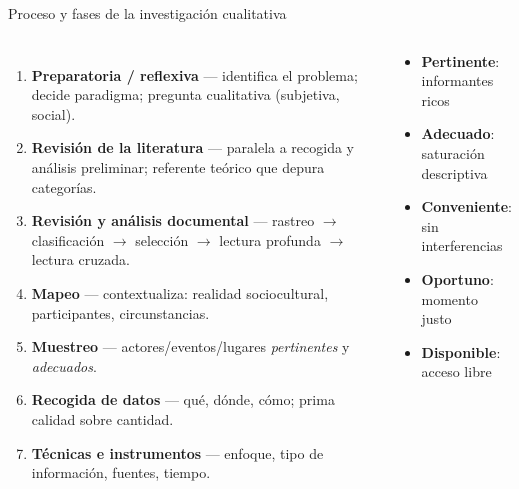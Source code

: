 \documentclass[aspectratio=169,8pt]{beamer}
\begin{document}
\begin{frame}{Proceso y fases de la investigaci\'on cualitativa}
  \small
  \begin{columns}[T,onlytextwidth]
      \begin{enumerate}
        \item \textbf{Preparatoria / reflexiva} --- identifica el problema; decide paradigma; pregunta cualitativa (subjetiva, social).
        \item \textbf{Revisi\'on de la literatura} --- paralela a recogida y an\'alisis preliminar; referente te\'orico que depura categor\'ias.
        \item \textbf{Revisi\'on y an\'alisis documental} --- rastreo $\to$ clasificaci\'on $\to$ selecci\'on $\to$ lectura profunda $\to$ lectura cruzada.
        \item \textbf{Mapeo} --- contextualiza: realidad sociocultural, participantes, circunstancias.
        \item \textbf{Muestreo} --- actores/eventos/lugares \emph{pertinentes} y \emph{adecuados}.
        \item \textbf{Recogida de datos} --- qu\'e, d\'onde, c\'omo; prima calidad sobre cantidad.
        \item \textbf{T\'ecnicas e instrumentos} --- enfoque, tipo de informaci\'on, fuentes, tiempo.
      \end{enumerate}
      \begin{tcolorbox}[infobox,title=Criterios del muestreo cualitativo]
        \footnotesize
        \begin{itemize}
          \item \textbf{Pertinente}: informantes ricos
          \item \textbf{Adecuado}: saturaci\'on descriptiva
          \item \textbf{Conveniente}: sin interferencias
          \item \textbf{Oportuno}: momento justo
          \item \textbf{Disponible}: acceso libre
        \end{itemize}
      \end{tcolorbox}
    \end{columns}
\end{frame}
\end{document}
